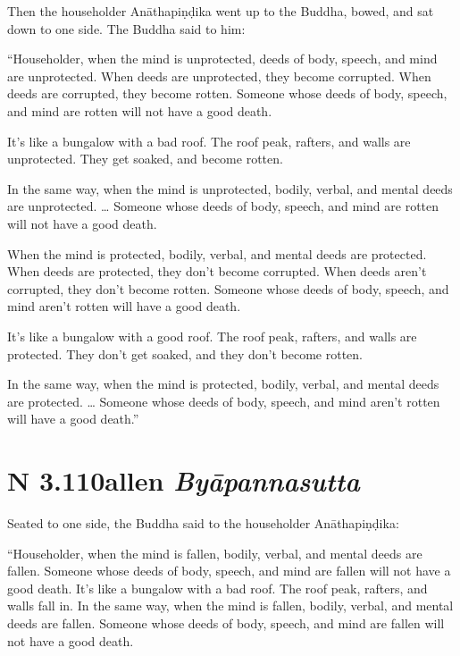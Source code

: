 \documentclass[12pt,openany]{book}%
\newcommand*{\suttatitleacronym}[1]{\smaller[2]{#1}\vspace*{.3em}}
\newcommand*{\suttatitletranslation}[1]{\linebreak{#1}}
\newcommand*{\suttatitleroot}[1]{\linebreak\smaller[2]\itshape{#1}}
\newcommand*{\tocacronym}[1]{\hspace*{-3.3em}{#1}\quad}
\newcommand*{\toctranslation}[1]{#1}
\newcommand*{\tocroot}[1]{(\textit{#1})}
\begin{document}
Then the householder \textsanskrit{Anāthapiṇḍika} went up to the Buddha, bowed, and sat down to one side. The Buddha said to him: 

“Householder, when the mind is unprotected, deeds of body, speech, and mind are unprotected. When deeds are unprotected, they become corrupted. When deeds are corrupted, they become rotten. Someone whose deeds of body, speech, and mind are rotten will not have a good death. 

It’s like a bungalow with a bad roof. The roof peak, rafters, and walls are unprotected. They get soaked, and become rotten. 

In the same way, when the mind is unprotected, bodily, verbal, and mental deeds are unprotected. … Someone whose deeds of body, speech, and mind are rotten will not have a good death. 

When the mind is protected, bodily, verbal, and mental deeds are protected. When deeds are protected, they don’t become corrupted. When deeds aren’t corrupted, they don’t become rotten. Someone whose deeds of body, speech, and mind aren’t rotten will have a good death. 

It’s like a bungalow with a good roof. The roof peak, rafters, and walls are protected. They don’t get soaked, and they don’t become rotten. 

In the same way, when the mind is protected, bodily, verbal, and mental deeds are protected. … Someone whose deeds of body, speech, and mind aren’t rotten will have a good death.” 

%
\section*{{\suttatitleacronym AN 3.110}{\suttatitletranslation Fallen }{\suttatitleroot Byāpannasutta}}
\addcontentsline{toc}{section}{\tocacronym{AN 3.110} \toctranslation{Fallen } \tocroot{Byāpannasutta}}

Seated to one side, the Buddha said to the householder \textsanskrit{Anāthapiṇḍika}: 

“Householder, when the mind is fallen, bodily, verbal, and mental deeds are fallen. Someone whose deeds of body, speech, and mind are fallen will not have a good death. It’s like a bungalow with a bad roof. The roof peak, rafters, and walls fall in. In the same way, when the mind is fallen, bodily, verbal, and mental deeds are fallen. Someone whose deeds of body, speech, and mind are fallen will not have a good death. 
\end{document}
